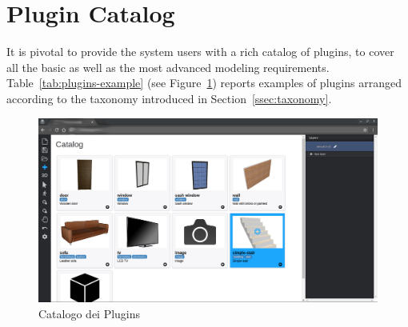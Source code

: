 \section{Plugin Catalog}
\label{sec:chapter_3_section_4}

\noindent
It is pivotal to provide the system users with a rich catalog of plugins, to cover all the basic as well as the most advanced modeling requirements.
Table~\ref{tab:plugins-example} (see Figure~\ref{fig:catalog}) reports examples of plugins arranged according to the  taxonomy introduced in Section~\ref{ssec:taxonomy}.

\begin{figure}[htbp] %
   \centering
   \includegraphics[width=1\linewidth]{images/figcatalog}
   \caption{Catalogo dei Plugins}
   \label{fig:catalog}
\end{figure}
